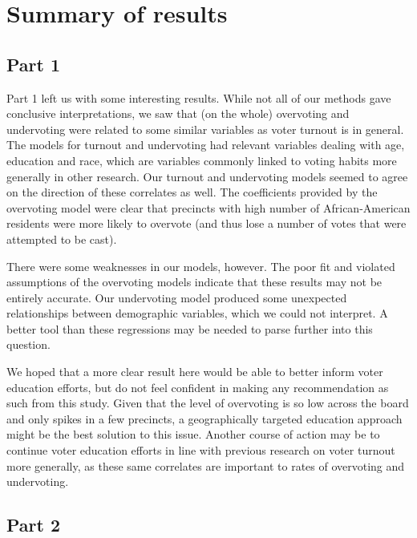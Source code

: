 \documentclass[12pt,twoside]{reedthesis}
\begin{document}
\hypertarget{summary-of-results}{%
\section{Summary of results}\label{summary-of-results}}

\hypertarget{part-1-1}{%
\subsection{Part 1}\label{part-1-1}}

Part 1 left us with some interesting results. While not all of our methods gave conclusive interpretations, we saw that (on the whole) overvoting and undervoting were related to some similar variables as voter turnout is in general. The models for turnout and undervoting had relevant variables dealing with age, education and race, which are variables commonly linked to voting habits more generally in other research. Our turnout and undervoting models seemed to agree on the direction of these correlates as well. The coefficients provided by the overvoting model were clear that precincts with high number of African-American residents were more likely to overvote (and thus lose a number of votes that were attempted to be cast).

There were some weaknesses in our models, however. The poor fit and violated assumptions of the overvoting models indicate that these results may not be entirely accurate. Our undervoting model produced some unexpected relationships between demographic variables, which we could not interpret. A better tool than these regressions may be needed to parse further into this question.

We hoped that a more clear result here would be able to better inform voter education efforts, but do not feel confident in making any recommendation as such from this study. Given that the level of overvoting is so low across the board and only spikes in a few precincts, a geographically targeted education approach might be the best solution to this issue. Another course of action may be to continue voter education efforts in line with previous research on voter turnout more generally, as these same correlates are important to rates of overvoting and undervoting.

\hypertarget{part-2-1}{%
\subsection{Part 2}\label{part-2-1}}
\end{document}
